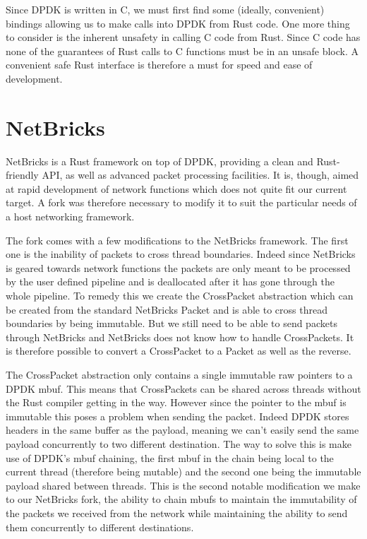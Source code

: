 \documentclass[11pt]{article}
\begin{document}
Since DPDK is written in C, we must first find some (ideally,
convenient) bindings allowing us to make calls into DPDK from Rust
code. One more thing to consider is the inherent unsafety in calling C
code from Rust. Since C code has none of the guarantees of Rust calls
to C functions must be in an unsafe block. A convenient safe Rust
interface is therefore a must for speed and ease of development.

\section{NetBricks}
NetBricks is a Rust framework on top of DPDK, providing a clean and
Rust-friendly API, as well as advanced packet processing facilities.
It is, though, aimed at rapid development of network functions which
does not quite fit our current target. A fork was therefore necessary
to modify it to suit the particular needs of a host networking
framework.

The fork comes with a few modifications to the NetBricks
framework. The first one is the inability of packets to cross thread
boundaries. Indeed since NetBricks is geared towards network functions
the packets are only meant to be processed by the user defined
pipeline and is deallocated after it has gone through the whole
pipeline. To remedy this we create the CrossPacket abstraction which
can be created from the standard NetBricks Packet and is able to cross
thread boundaries by being immutable. But we still need to be able to
send packets through NetBricks and NetBricks does not know how to
handle CrossPackets. It is therefore possible to convert a CrossPacket
to a Packet as well as the reverse.

The CrossPacket abstraction only contains a single immutable raw
pointers to a DPDK mbuf. This means that CrossPackets can be shared
across threads without the Rust compiler getting in the way. However
since the pointer to the mbuf is immutable this poses a problem when
sending the packet. Indeed DPDK stores headers in the same buffer as
the payload, meaning we can't easily send the same payload
concurrently to two different destination. The way to solve this is
make use of DPDK's mbuf chaining, the first mbuf in the chain being
local to the current thread (therefore being mutable) and the second
one being the immutable payload shared between threads. This is the
second notable modification we make to our NetBricks fork, the ability
to chain mbufs to maintain the immutability of the packets we received
from the network while maintaining the ability to send them
concurrently to different destinations.
\end{document}
